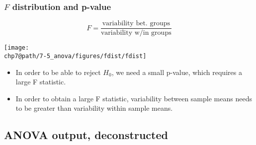 \documentclass[slidestop,compress,mathserif]{beamer}
\makeatletter
\def\chp7@path{../../Chp 7}
\makeatother
\begin{document}
\begin{frame}
\frametitle{$F$ distribution and p-value}

\[ F =  \frac{\text{variability bet. groups}}{\text{variability w/in groups}} \]

\vspace{-1cm}

\begin{center}
\texttt{[image: \\chp7@path/7-5\_anova/figures/fdist/fdist]}
\end{center}

\begin{itemize}

\item In order to be able to reject $H_0$, we need a small p-value, which requires a large F statistic.

\item In order to obtain a large F statistic, variability between sample means needs to be greater than variability within sample means.

\end{itemize}

\end{frame}


\subsection{ANOVA output, deconstructed}

\end{document}
